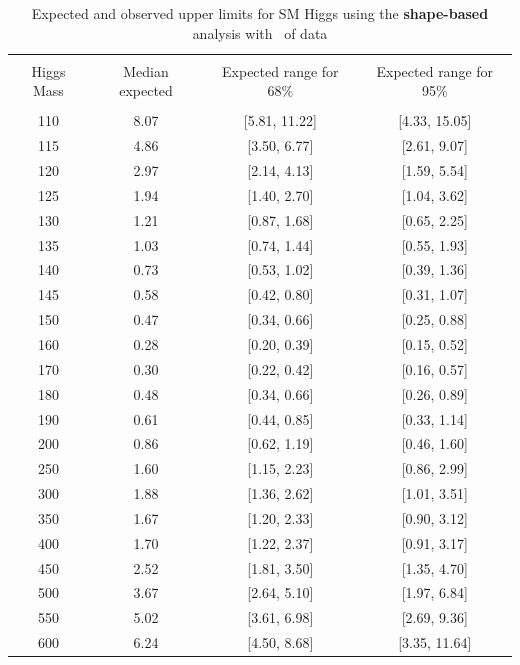 \begin{table}[hbp!]
\begin{center}
\begin{tabular}{c c c c}
\hline
\vspace{-3mm} && \\
 Higgs Mass   & Median expected & Expected range for 68\% & Expected range for 95\%   \\
\vspace{-3mm} && \\
\hline
110 & 8.07 & [5.81, 11.22] & [4.33, 15.05] \\ 
115 & 4.86 & [3.50, 6.77] & [2.61, 9.07] \\   
120 & 2.97 & [2.14, 4.13] & [1.59, 5.54] \\   
125 & 1.94 & [1.40, 2.70] & [1.04, 3.62] \\   
130 & 1.21 & [0.87, 1.68] & [0.65, 2.25] \\   
135 & 1.03 & [0.74, 1.44] & [0.55, 1.93] \\   
140 & 0.73 & [0.53, 1.02] & [0.39, 1.36] \\   
145 & 0.58 & [0.42, 0.80] & [0.31, 1.07] \\   
150 & 0.47 & [0.34, 0.66] & [0.25, 0.88] \\   
160 & 0.28 & [0.20, 0.39] & [0.15, 0.52] \\   
170 & 0.30 & [0.22, 0.42] & [0.16, 0.57] \\   
180 & 0.48 & [0.34, 0.66] & [0.26, 0.89] \\   
190 & 0.61 & [0.44, 0.85] & [0.33, 1.14] \\   
200 & 0.86 & [0.62, 1.19] & [0.46, 1.60] \\   
250 & 1.60 & [1.15, 2.23] & [0.86, 2.99] \\   
300 & 1.88 & [1.36, 2.62] & [1.01, 3.51] \\   
350 & 1.67 & [1.20, 2.33] & [0.90, 3.12] \\   
400 & 1.70 & [1.22, 2.37] & [0.91, 3.17] \\   
450 & 2.52 & [1.81, 3.50] & [1.35, 4.70] \\   
500 & 3.67 & [2.64, 5.10] & [1.97, 6.84] \\   
550 & 5.02 & [3.61, 6.98] & [2.69, 9.36] \\   
600 & 6.24 & [4.50, 8.68] & [3.35, 11.64] \\  
\hline
\end{tabular}
\caption{Expected and observed upper limits for SM Higgs using the
  {\bf shape-based} analysis with \intlumiEightTeV\ of data}
\label{tab:mvabase_uls}
\end{center}
\end{table}
